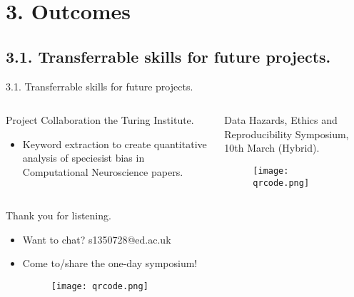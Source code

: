 \documentclass[t]{beamer}
\begin{document}
\section{3. Outcomes}
\subsection{3.1. Transferrable skills for future projects.}
\begin{frame}{3.1. Transferrable skills for future projects.}
	\begin{columns}[T,totalwidth=\textwidth]
  		\begin{column}{0.45\textwidth}
  			\begin{block}{Project Collaboration the Turing Institute.}
    				\begin{itemize}    
    					\item Keyword extraction to create quantitative analysis of speciesist bias in Computational Neuroscience papers. 
    				\end{itemize}  
			\end{block}
  		\end{column} %
  		\begin{column}{0.6\textwidth}
  			\begin{block}{Data Hazards, Ethics and Reproducibility Symposium, 10th March (Hybrid).}
			\begin{figure}
				\vspace{-\blocktitlesize}
				\texttt{[image: qrcode.png]}
			\end{figure}
			\end{block}
  		\end{column}%
	\end{columns}
\end{frame}



\begin{frame}{Thank you for listening.}	
    \begin{itemize}
        \item Want to chat? s1350728@ed.ac.uk
        \item Come to/share the one-day symposium!
        \hfill \break
        \begin{figure}
				\vspace{-\blocktitlesize}\texttt{[image: qrcode.png]}
			\end{figure}
    \end{itemize}
\end{frame}
\end{document}
